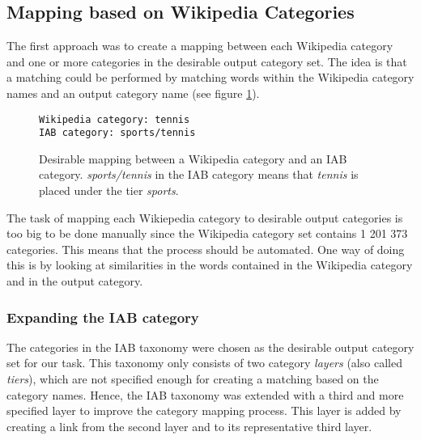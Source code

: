 \subsection{Mapping based on Wikipedia Categories}
\label{sec:mapping_based_on_wikipedia_categories}
The first approach was to create a mapping between each Wikipedia category and one or more categories in the desirable output category set. The idea is that a matching could be performed by matching words within the Wikipedia category names and an output category name (see figure \ref{fig:category_to_category_mapping}).

\begin{figure}[h]
\centering
\begin{lstlisting}
Wikipedia category: tennis
IAB category: sports/tennis
\end{lstlisting}
\caption[Mapping between Wikipedia category and IAB category]{Desirable mapping between a Wikipedia category and an IAB category. \emph{sports/tennis} in the IAB category means that \emph{tennis} is placed under the tier \emph{sports}.}
\label{fig:category_to_category_mapping}
\end{figure}

The task of mapping each Wikiepedia category to desirable output categories is too big to be done manually since the Wikipedia category set contains 1 201 373 categories. This means that the process should be automated. One way of doing this is by looking at similarities in the words contained in the Wikipedia category and in the output category.

\subsubsection{Expanding the IAB category}
The categories in the IAB taxonomy were chosen as the desirable output category set for our task. This taxonomy  only consists of two category \emph{layers} (also called \emph{tiers}), which are not specified enough for creating a matching based on the category names. Hence, the IAB taxonomy was extended with a third and more specified layer to improve the category mapping process. This layer is added by creating a link from the second layer and to its representative third layer.

